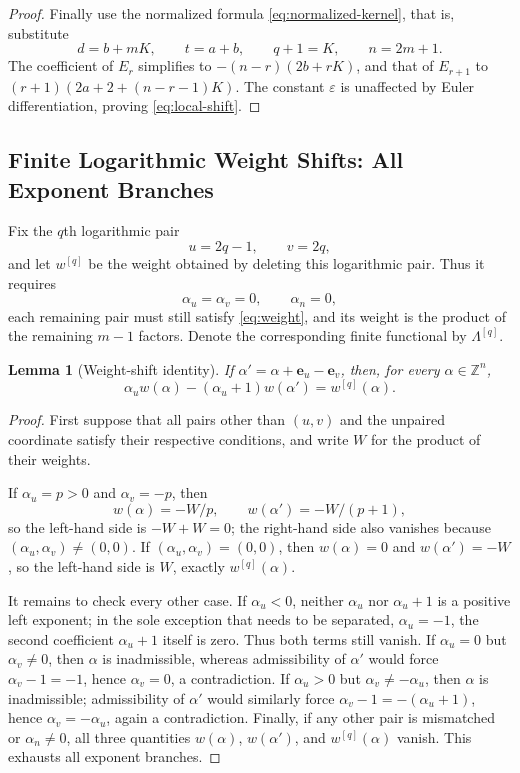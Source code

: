 \documentclass[11pt,a4paper]{article}
\newtheorem{lemma}[theorem]{Lemma}
\theoremstyle{definition}
\begin{document}
\begin{proof}
Finally use the normalized formula \eqref{eq:normalized-kernel}, that
is, substitute
\[
d=b+mK,\qquad t=a+b,\qquad q+1=K,\qquad n=2m+1.
\]
The coefficient of $E_r$ simplifies to
$-(n-r)(2b+rK)$, and that of $E_{r+1}$ to
$(r+1)(2a+2+(n-r-1)K)$.  The constant $\varepsilon$ is unaffected by
Euler differentiation, proving \eqref{eq:local-shift}.
\end{proof}

\subsection{Finite Logarithmic Weight Shifts: All Exponent Branches}

Fix the $q$th logarithmic pair
\[
u=2q-1,\qquad v=2q,
\]
and let $w^{[q]}$ be the weight obtained by deleting this logarithmic
pair.  Thus it requires
\[
\alpha_u=\alpha_v=0,\qquad \alpha_n=0,
\]
each remaining pair must still satisfy \eqref{eq:weight}, and its
weight is the product of the remaining $m-1$ factors.  Denote the
corresponding finite functional by $\Lambda^{[q]}$.

\begin{lemma}[Weight-shift identity]\label{lem:weight-scale}
If $\alpha'=\alpha+\bm e_u-\bm e_v$, then, for every
$\alpha\in\mathbb Z^n$,
\begin{equation}\label{eq:weight-scale}
\alpha_u w(\alpha)-(\alpha_u+1)w(\alpha')
=w^{[q]}(\alpha).
\end{equation}
\end{lemma}

\begin{proof}
First suppose that all pairs other than $(u,v)$ and the unpaired
coordinate satisfy their respective conditions, and write $W$ for the
product of their weights.

If $\alpha_u=p>0$ and $\alpha_v=-p$, then
\[
w(\alpha)=-W/p,\qquad w(\alpha')=-W/(p+1),
\]
so the left-hand side is $-W+W=0$; the right-hand side also vanishes
because $(\alpha_u,\alpha_v)\ne(0,0)$.  If
$(\alpha_u,\alpha_v)=(0,0)$, then $w(\alpha)=0$ and
$w(\alpha')=-W$, so the left-hand side is $W$, exactly
$w^{[q]}(\alpha)$.

It remains to check every other case.  If $\alpha_u<0$, neither
$\alpha_u$ nor $\alpha_u+1$ is a positive left exponent; in the sole
exception that needs to be separated, $\alpha_u=-1$, the second
coefficient $\alpha_u+1$ itself is zero.  Thus both terms still vanish.
If $\alpha_u=0$ but $\alpha_v\ne0$, then $\alpha$ is inadmissible,
whereas admissibility of $\alpha'$ would force
$\alpha_v-1=-1$, hence $\alpha_v=0$, a contradiction.  If
$\alpha_u>0$ but $\alpha_v\ne-\alpha_u$, then $\alpha$ is
inadmissible; admissibility of $\alpha'$ would similarly force
$\alpha_v-1=-(\alpha_u+1)$, hence
$\alpha_v=-\alpha_u$, again a contradiction.  Finally, if any other
pair is mismatched or $\alpha_n\ne0$, all three quantities
$w(\alpha)$, $w(\alpha')$, and $w^{[q]}(\alpha)$ vanish.  This exhausts
all exponent branches.
\end{proof}
\end{document}
